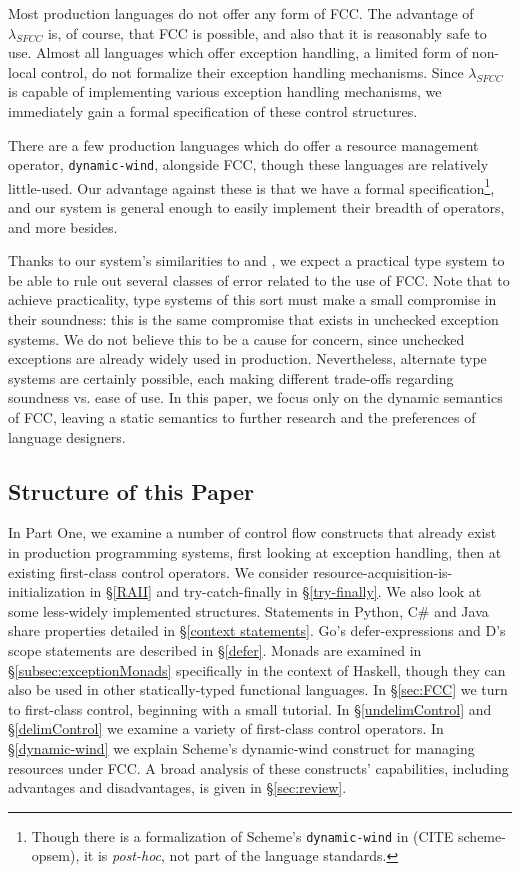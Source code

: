 \documentclass[11pt]{article}
\newcommand{\maybePage}{\newpage}
\begin{document}
Most production languages do not offer any form of FCC.
The advantage of $\lambda_{SFCC}$ is, of course, that FCC is possible, and also that it is reasonably safe to use.
Almost all languages which offer exception handling, a limited form of non-local control, do not formalize their exception handling mechanisms.
Since $\lambda_{SFCC}$ is capable of implementing various exception handling mechanisms, we immediately gain a formal specification of these control structures.

There are a few production languages which do offer a resource management operator, \texttt{dynamic-wind}, alongside FCC, though these languages are relatively little-used.
Our advantage against these is that we have a formal specification\footnote{Though there is a formalization of Scheme's \texttt{dynamic-wind} in (CITE scheme-opsem), it is \textit{post-hoc}, not part of the language standards.}, and our system is general enough to easily implement their breadth of operators, and more besides.

Thanks to our system's similarities to \cite{Gunter:1995} and \cite{MFDC}, we expect a practical type system to be able to rule out several classes of error related to the use of FCC.
Note that to achieve practicality, type systems of this sort must make a small compromise in their soundness: this is the same compromise that exists in unchecked exception systems.
We do not believe this to be a cause for concern, since unchecked exceptions are already widely used in production.
Nevertheless, alternate type systems are certainly possible, each making different trade-offs regarding soundness vs. ease of use.
In this paper, we focus only on the dynamic semantics of FCC, leaving a static semantics to further research and the preferences of language designers.

\maybePage
\subsection{Structure of this Paper}

In Part One, we examine a number of control flow constructs that already exist in production programming systems, first looking at exception handling, then at existing first-class control operators.
We consider resource-acquisition-is-initialization in \S\ref{RAII} and try-catch-finally in \S\ref{try-finally}.
We also look at some less-widely implemented structures.
Statements in Python, C\# and Java share properties detailed in \S\ref{context statements}.
Go's defer-expressions and D's scope statements are described in \S\ref{defer}.
Monads are examined in \S\ref{subsec:exceptionMonads} specifically in the context of Haskell, though they can also be used in other statically-typed functional languages.
In \S\ref{sec:FCC} we turn to first-class control, beginning with a small tutorial.
In \S\ref{undelimControl} and \S\ref{delimControl} we examine a variety of first-class control operators.
In \S\ref{dynamic-wind} we explain Scheme's dynamic-wind construct for managing resources under FCC.
A broad analysis of these constructs' capabilities, including advantages and disadvantages, is given in \S\ref{sec:review}.
\end{document}
